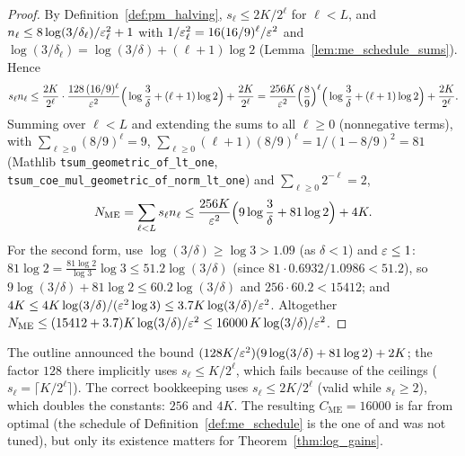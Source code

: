 \begin{proof}
\leanok
{}
By Definition~\ref{def:pm_halving}, $s_\ell\le2K/2^\ell$ for $\ell<L$, and
$n_\ell\le8\log(3/\delta_\ell)/\varepsilon_\ell^2+1$ with $1/\varepsilon_\ell^2 = 16(16/9)^\ell/\varepsilon^2$ and
$\log(3/\delta_\ell) = \log(3/\delta)+(\ell+1)\log2$ (Lemma~\ref{lem:me_schedule_sums}). Hence
\[
  s_\ell n_\ell\le\frac{2K}{2^\ell}\cdot\frac{128\,(16/9)^\ell}{\varepsilon^2}\Big(\log\frac3\delta+(\ell+1)\log2\Big)+\frac{2K}{2^\ell}
  = \frac{256K}{\varepsilon^2}\Big(\frac89\Big)^\ell\Big(\log\frac3\delta+(\ell+1)\log2\Big)+\frac{2K}{2^\ell}.
\]
Summing over $\ell<L$ and extending the sums to all $\ell\ge0$ (nonnegative terms), with
$\sum_{\ell\ge0}(8/9)^\ell = 9$, $\sum_{\ell\ge0}(\ell+1)(8/9)^\ell = 1/(1-8/9)^2 = 81$ (Mathlib
\texttt{tsum\_geometric\_of\_lt\_one}, \texttt{tsum\_coe\_mul\_geometric\_of\_norm\_lt\_one}) and
$\sum_{\ell\ge0}2^{-\ell} = 2$,
\[
  N_{\mathrm{ME}} = \sum_{\ell<L}s_\ell n_\ell\le\frac{256K}{\varepsilon^2}\Big(9\log\frac3\delta+81\log2\Big)+4K .
\]
For the second form, use $\log(3/\delta)\ge\log3>1.09$ (as $\delta<1$) and $\varepsilon\le1$:
$81\log2 = \frac{81\log2}{\log3}\log3\le 51.2\log(3/\delta)$ (since $81\cdot0.6932/1.0986<51.2$),
so $9\log(3/\delta)+81\log2\le 60.2\log(3/\delta)$ and $256\cdot60.2<15412$; and
$4K\le 4K\log(3/\delta)/(\varepsilon^2\log3)\le 3.7K\log(3/\delta)/\varepsilon^2$. Altogether
$N_{\mathrm{ME}}\le(15412+3.7)K\log(3/\delta)/\varepsilon^2\le16000\,K\log(3/\delta)/\varepsilon^2$.
\end{proof}

\begin{remark}\label{rem:pm_budget_constants}
The outline announced the bound $(128K/\varepsilon^2)(9\log(3/\delta)+81\log2)+2K$; the factor $128$
there implicitly uses $s_\ell\le K/2^\ell$, which fails because of the ceilings
($s_\ell = \lceil K/2^\ell\rceil$). The correct bookkeeping uses $s_\ell\le2K/2^\ell$ (valid while
$s_\ell\ge2$), which doubles the constants: $256$ and $4K$. The resulting
$C_{\mathrm{ME}} = 16000$ is far from optimal (the schedule of Definition~\ref{def:me_schedule}
is the one of \cite{even2002pac} and was not tuned), but only its existence matters for
Theorem~\ref{thm:log_gains}.
\end{remark}

